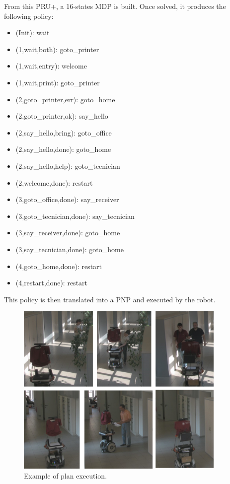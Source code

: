 From this PRU+, a 16-states MDP is built. %
Once solved, it produces the following policy:
\begin{multicols}{2}
  \begin{small}
    \begin{itemize}
    \item (Init): wait
    \item (1,wait,both): goto\_printer
    \item (1,wait,entry): welcome
    \item (1,wait,print): goto\_printer
    \item (2,goto\_printer,err): goto\_home
    \item (2,goto\_printer,ok): say\_hello
    \item (2,say\_hello,bring): goto\_office
    \item (2,say\_hello,done): goto\_home
    \item (2,say\_hello,help): goto\_tecnician
    \item (2,welcome,done): restart
    \item (3,goto\_office,done): say\_receiver
    \item (3,goto\_tecnician,done): say\_tecnician
    \item (3,say\_receiver,done): goto\_home
    \item (3,say\_tecnician,done): goto\_home
    \item (4,goto\_home,done): restart
    \item (4,restart,done): restart
    \end{itemize}
  \end{small}
\end{multicols}

This policy is then translated into a PNP and executed by the robot.

\begin{figure}
\centering
\includegraphics[width=0.9\textwidth]{fig/DIAGPrinter-demo}
\caption{Example of plan execution.}
\label{fig:DIAGtest}
\end{figure}


